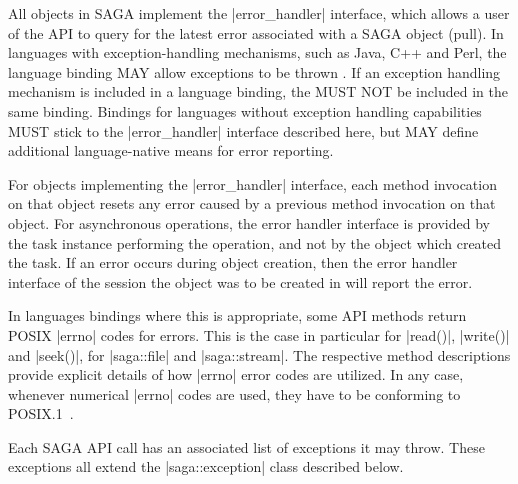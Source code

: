  
 
  All objects in SAGA implement the |error_handler| interface,
  which allows a user of the API to query for the latest error
  associated with a SAGA object (pull).  In languages with
  exception-handling mechanisms, such as Java, C++ and Perl, the
  language binding MAY allow exceptions to be thrown
  .  If an exception handling mechanism is
  included in a language binding, the  MUST
  NOT be included in the same binding.  Bindings for languages
  without exception handling capabilities MUST stick to the
  |error_handler| interface described here, but MAY define
  additional language-native means for error reporting.
 
  For objects implementing the |error_handler| interface, each
   method invocation on that object resets any
  error caused by a previous method invocation on that object.
  For asynchronous operations, the error handler interface is
  provided by the task instance performing the operation, and
  not by the object which created the task.  If an error occurs
  during object creation, then the error handler interface of
  the session the object was to be created in will report the
  error.
  
  In languages bindings where this is appropriate, some API
  methods  return POSIX |errno| codes for errors.
  This is the case in particular for |read()|, |write()| and
  |seek()|, for |saga::file| and |saga::stream|.  The respective
  method descriptions provide explicit details of how |errno|
  error codes are utilized.  In any case, whenever numerical
  |errno| codes are used, they have to be conforming to
  POSIX.1~\cite{posix1}.
 
 
  Each SAGA API call has an associated list of exceptions it may
  throw.  These exceptions all extend the |saga::exception|
  class described below.  



